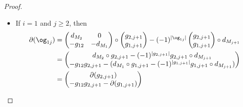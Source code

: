 \documentclass[a4paper]{amsart}
\begin{document}
\begin{proof}
\begin{itemize}
\begin{align*}
                                                                                                                                                                                                                                                                                                                                                                                                         =-\og_{01}\og_{1j}+\sum_{2<\ell<j+1}(-1)^{1-\ell}\og_{0,\ell-1}\og_{\ell-1,j}
      \\ & =\sum_{0<k<j}(-1)^{-k}\og_{0k}\og_{kj},
    \end{align*}
    where the equality $\partial(\og_{0j})=-\partial(g_{0,j+1})$ stems from the
    fact that the target of $\og_{0j}$ is the DG $\A$-module $M_0[-1]$, which
    has the differential $-d_{M_0}$. \item If $i=1$ and $j\geq 2$, then
    \begin{align*}
      \partial(\og_{1j}) & =\begin{pmatrix}
                              d_{M_2} & 0 \\ -g_{12} & -d_{M_1}
                            \end{pmatrix}\circ\begin{pmatrix}
                                                g_{2,j+1} \\ g_{1,j+1}
                                              \end{pmatrix}-(-1)^{|\og_{1j}|}                                           %
                           \begin{pmatrix}
                             g_{2,j+1} \\ g_{1,j+1}
                           \end{pmatrix}\circ d_{M_{j+1}}                                                                                    \\
                         & =\begin{pmatrix}
                              d_{M_2}\circ g_{2,j+1}-(-1)^{|g_{2,j+1}|}g_{2,j+1}\circ d_{M_{j+1}} \\
                              -g_{12}g_{2,j+1}-(d_{M_1}\circ g_{1,j+1}-(-1)^{|g_{1,j+1}|}g_{1,j+1}\circ
                              d_{M_{j+1}})
                            \end{pmatrix}  \\
                         & =\begin{pmatrix}
                              \partial(g_{2,j+1}) \\ -g_{12}g_{2,j+1}-\partial(g_{1,j+1})

\end{pmatrix}
\end{align*}
\end{itemize}
\end{proof}
\end{document}
